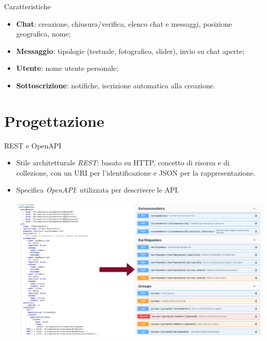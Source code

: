 \documentclass[compress]{beamer}
\begin{document}
\begin{frame}[c]{Caratteristiche}
\begin{itemize}
\item \textbf{Chat}: creazione, chiusura/verifica, elenco chat e messaggi, posizione geografica, nome;
\vspace{0.5em}
\item \textbf{Messaggio}: tipologie (testuale, fotografico, slider), invio su chat aperte;
\vspace{0.5em}
\item \textbf{Utente}: nome utente personale;
\vspace{0.5em}
\item \textbf{Sottoscrizione}: notifiche, iscrizione automatica alla creazione.
\end{itemize}
\end{frame}

\section{Progettazione}

\begin{frame}[c]{REST e OpenAPI}
\begin{itemize}
\item Stile architetturale \textit{REST}: basato su HTTP, concetto di risorsa e di collezione, con un URI per l'identificazione e JSON per la rappresentazione.
\vspace{0.5em}
\item Specifica \textit{OpenAPI}: utilizzata per descrivere le API.
\begin{center}
\includegraphics[scale=0.5]{presentation/assets/codice2openapi.pdf}
\end{center}
\end{itemize}
\end{frame}
\end{document}
